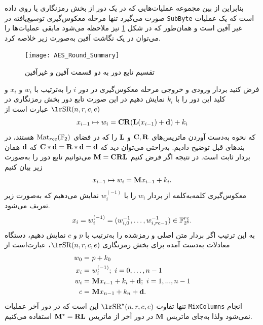  بنابراین از بین مجموعه عملیات‌هایی که در یک دور از بخش رمزنگاری
 یا 
 روی داده صورت می‌گیرد تنها مرحله معکوس‌گیری توسیع‌یافته در 
 \texttt{SubByte}
 است که یک عملیات غیر آفین است و  همان‌طور که در شکل  
 \ref{fig:AES_Round_Summary}
 نیز ملاحظه می‌شود مابقی عملیات‌ها را می‌توان در یک نگاشت آفین به‌صورت زیر خلاصه کرد.
 \begin{figure}
 	\centering
 	\texttt{[image: AES\_Round\_Summary]}
 	\caption{تقسیم تابع دور 
 		به دو قسمت آفین و غیرآفین}
 	\label{fig:AES_Round_Summary}
 \end{figure}
فرض کنید 
بردار ورودی و خروجی مرحله معکوس‌گیری  در دور 
$i$
را به‌ترتیب با 
$w_{i}$
و 
$x_{i}$
و کلید این دور را با 
$k_{i}$
نمایش دهیم در این صورت تابع دور بخش رمزنگاری در 
$\text{\en{SR}}(n,r,c,e)$
عبارت است از 
$$x_{i-1}\mapsto w_{i} = {\bf CR}({\bf L}(x_{i-1}) + {\bf d}) + k_{i}$$
که نحوه به‌دست آوردن ماتریس‌های 
$\bf{C}, \bf{R}$
و 
$\bf{L}$
را که در فضای 
$\operatorname{\mathrm{Mat}}_{rce}(\mathbb{F}_{2})$
هستند، در بندهای قبل توضیح دادیم. به‌راحتی می‌توان دید که 
$\bf{C* d =  R* d = d}$
که 
$\bf{d}$
همان بردار ثابت 
است. در نتیجه اگر فرض کنیم 
$\bf{M} = \bf{CRL}$
می‌توانیم تابع دور را به‌صورت زیر بیان کنیم
$$x_{i-1}\mapsto w_{i} = {\bf M}  x_{i-1} + k_{i}.$$
معکوس‌گیری کلمه‌به‌کلمه از بردار 
$w_{i}$
را با 
$w_{i}^{(-1)}$
نمایش می‌دهیم که به‌صورت زیر تعریف می‌شود. 
$$x_{i} = w_{i}^{(-1)} = (w_{i,0}^{-1},\ldots,w_{i,rc-1}^{-1})\in\mathbb{F}_{2^{8}}^{rc}.$$
به این ترتیب اگر بردار متن اصلی و رمزشده را به‌ترتیب با 
$p$
و 
$c$
نمایش دهیم،  دستگاه معادلات به‌دست آمده برای بخش رمزنگاری
$\text{\en{SR}}(n,r,c,e)$، 
عبارت‌است از 
\begin{equation}
\begin{split}
w_{0} =&  \ p + k_{0}\\
x_{i} =& \ w_{i}^{(-1)}; \ i = 0,\ldots,n-1\\
w_{i} =&  \ {\bf M} x_{i-1} + k_{i} + {\bf d}; \  i = 1,...,n-1\\
c =&  \ {\bf M}x_{n-1} + k_{n} + {\bf d}.
\end{split}
\label{eq:enc_round_of_SR}
\end{equation}
تنها تفاوت 
$\text{\en{SR}}^{\star}(n,r,c,e)$
این است که در دور آخر عملیات 
\texttt{MixColumns}
انجام نمی‌شود ولذا به‌جای ماتریس 
${\bf M}$
در دور آخر از ماتریس 
${\bf M^{\star} = RL}$
استفاده می‌کنیم. 

